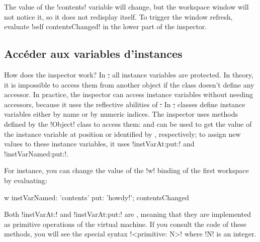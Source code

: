 \documentclass[a4paper,10pt,twoside]{book}
\begin{document}
The value of the \ct!contents! variable will change, but the workspace window will not notice it, so it does not redisplay itself.
To trigger the window refresh, evaluate \ct!self contentsChanged! in the lower part of the inspector.

\subsection{Accéder aux variables d'instances}

How does the inspector work?
In \st, all instance variables are protected.
In theory, it is impossible to access them from another object if the class doesn't define any accessor.
In practice, the inspector can access instance variables without needing accessors, because it uses the reflective abilities of \st.
In \st, classes define instance variables either by name or by numeric indices.
The inspector uses methods defined by the \ct!Object! class to access them:  and  can be used to get the value of the instance variable at position  or identified by , respectively; to assign new values to these instance variables, it uses \ct!instVarAt:put:! and \ct!instVarNamed:put:!.

For instance, you can change the value of the \ct!w! binding of the first workspace by evaluating:
\begin{code}{}
w instVarNamed: 'contents' put: 'howdy!'; contentsChanged
\end{code}


Both \ct!instVarAt:! and \ct!instVarAt:put:! are , meaning that they are implemented as primitive operations of the \pharo virtual machine.
If you consult the code of these methods, you will see the special  syntax \ct!<primitive: N>! where \ct!N! is an integer.
\end{document}
